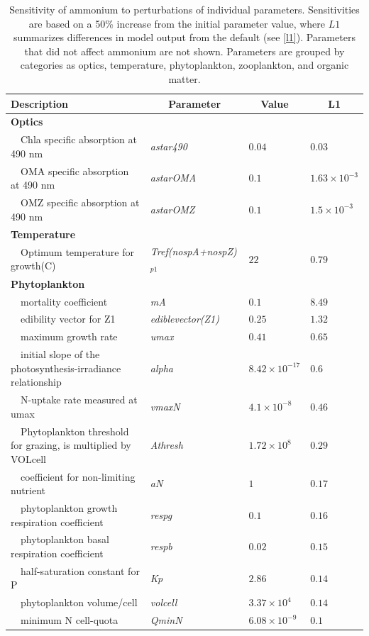 \documentclass[review]{elsarticle}\usepackage[]{graphicx}\usepackage[]{color}
\begin{document}
\begin{table}[!tbp]
{\footnotesize
\caption{Sensitivity of ammonium to perturbations of individual parameters.  Sensitivities are based on a 50\% increase from the initial parameter value, where $L1$ summarizes differences in model output from the default (see \cref{l1}).  Parameters that did not affect ammonium are not shown.  Parameters are grouped by categories as optics, temperature, phytoplankton, zooplankton, and organic matter.\label{tab:nh4sens}} 
\begin{center}
\begin{tabular}{llll}
\hline\hline
\multicolumn{1}{l}{Description}&\multicolumn{1}{c}{Parameter}&\multicolumn{1}{c}{Value}&\multicolumn{1}{c}{L1}\tabularnewline
\hline
{\bfseries Optics}&&&\tabularnewline
~~Chla specific absorption at 490 nm&\textit{astar490}&$0.04$&$0.03$\tabularnewline
~~OMA specific absorption at 490 nm&\textit{astarOMA}&$0.1$&$1.63\times 10^{-3}$\tabularnewline
~~OMZ specific absorption at 490 nm&\textit{astarOMZ}&$0.1$&$1.5\times 10^{-3}$\tabularnewline
\hline
{\bfseries Temperature}&&&\tabularnewline
~~Optimum temperature for growth(C)&\textit{Tref(nospA+nospZ)$_{p1}$}&$22$&$0.79$\tabularnewline
\hline
{\bfseries Phytoplankton}&&&\tabularnewline
~~mortality coefficient&\textit{mA}&$0.1$&$8.49$\tabularnewline
~~edibility vector for Z1&\textit{ediblevector(Z1)}&$0.25$&$1.32$\tabularnewline
~~maximum growth rate&\textit{umax}&$0.41$&$0.65$\tabularnewline
~~initial slope of the photosynthesis-irradiance relationship&\textit{alpha}&$8.42\times 10^{-17}$&$0.6$\tabularnewline
~~N-uptake rate measured at umax&\textit{vmaxN}&$4.1\times 10^{-8}$&$0.46$\tabularnewline
~~Phytoplankton threshold for grazing, is multiplied by VOLcell&\textit{Athresh}&$1.72\times 10^{8}$&$0.29$\tabularnewline
~~coefficient for non-limiting nutrient&\textit{aN}&$1$&$0.17$\tabularnewline
~~phytoplankton growth respiration coefficient&\textit{respg}&$0.1$&$0.16$\tabularnewline
~~phytoplankton basal respiration coefficient&\textit{respb}&$0.02$&$0.15$\tabularnewline
~~half-saturation constant for P&\textit{Kp}&$2.86$&$0.14$\tabularnewline
~~phytoplankton volume/cell&\textit{volcell}&$3.37\times 10^{4}$&$0.14$\tabularnewline
~~minimum N cell-quota&\textit{QminN}&$6.08\times 10^{-9}$&$0.1$\tabularnewline

\end{tabular}
\end{center}}
\end{table}
\end{document}
